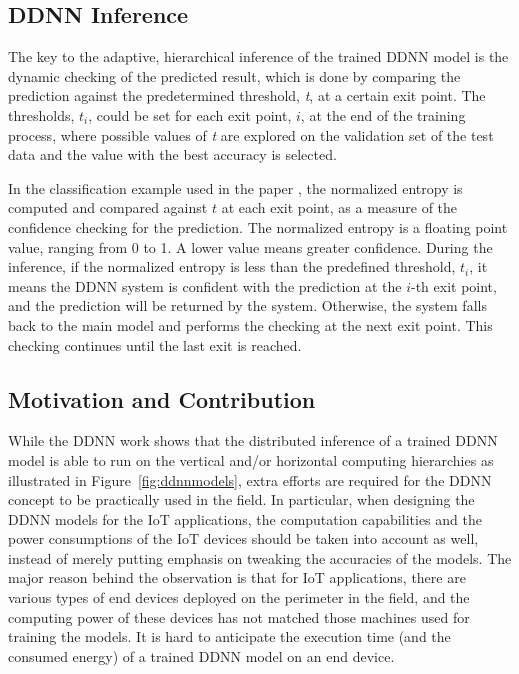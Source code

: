 \documentclass[format=acmsmall, review=false, screen=true]{acmart}
\def\figurename{Figure}
\begin{document}
\subsection{DDNN Inference}
\label{sec:ddnninference}
The key to the adaptive, hierarchical inference of the trained DDNN model is the dynamic checking of the predicted result, which is done by comparing the prediction against the predetermined threshold, \emph{t}, at a certain exit point. The thresholds, $t_{i}$, could be set for each exit point, $i$, at the end of the training process, where possible values of \emph{t} are explored on the validation set of the test data and the value with the best accuracy is selected.

In the classification example used in the paper \cite{Teerapittayanon17}, the normalized entropy is computed and compared against $t$ at each exit point, as a measure of the confidence checking for the prediction. The normalized entropy is a floating point value, ranging from 0 to 1. A lower value means greater confidence. During the inference, if the normalized entropy is less than the predefined threshold,  $t_{i}$, it means the DDNN system is confident with the prediction at the  $i$-th exit point, and the prediction will be returned by the system. Otherwise, the system falls back to the main model and performs the checking at the next exit point. This checking continues until the last exit is reached.

\subsection{Motivation and Contribution}
\label{sec:motivation}
While the DDNN work \cite{Teerapittayanon17} shows that the distributed inference of a trained DDNN model is able to run on the vertical and/or horizontal computing hierarchies as illustrated in \figurename~\ref{fig:ddnnmodels}, extra efforts are required for the DDNN concept to be practically used in the field. In particular, when designing the DDNN models for the IoT applications, the computation capabilities and the power consumptions of the IoT devices should be taken into account as well, instead of merely putting emphasis on tweaking the accuracies of the models. The major reason behind the observation is that for IoT applications, there are various types of end devices deployed on the perimeter in the field, and the computing power of these devices has not matched those machines used for training the models. It is hard to anticipate the execution time (and the consumed energy) of a trained DDNN model on an end device.
\end{document}
